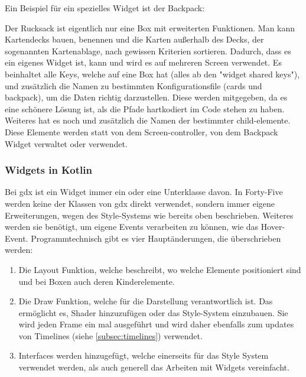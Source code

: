 Ein Beispiel für ein spezielles Widget ist der Backpack:
Der Rucksack ist eigentlich nur eine Box mit erweiterten Funktionen.
Man kann Kartendecks bauen, benennen und die Karten außerhalb des Decks, der sogenannten Kartenablage, nach gewissen Kriterien sortieren.
Dadurch, dass es ein eigenes Widget ist, kann und wird es auf mehreren Screen verwendet.
Es beinhaltet alle Keys, welche auf eine Box hat (alles ab den "widget shared keys"), und zusätzlich die Namen zu bestimmten Konfigurationsfile (cards und backpack), um die Daten richtig darzustellen.
Diese werden mitgegeben, da es eine schönere Lösung ist, als die Pfade hartkodiert im Code stehen zu haben.
Weiteres hat es noch und zusätzlich die Namen der bestimmter child-elemente.
Diese Elemente werden statt von dem Screen-controller, von dem Backpack Widget verwaltet oder verwendet.
\renewcommand{\kapitelautor}{Autor: Felix Zwickelstorfer}
\subsubsection{Widgets in Kotlin}\label{subsubsec:widgetsinkotlin}
\renewcommand{\kapitelautor}{Autor: Felix Zwickelstorfer}
Bei gdx ist ein Widget immer ein  oder eine Unterklasse davon.
In Forty-Five werden keine der Klassen von gdx direkt verwendet, sondern immer eigene Erweiterungen, wegen des Style-Systems wie bereits oben beschrieben.
Weiteres werden sie benötigt, um eigene Events verarbeiten zu können, wie das Hover-Event.
Programmtechnisch gibt es vier Hauptänderungen, die überschrieben werden:
\begin{enumerate}
    \item Die Layout Funktion, welche beschreibt, wo welche Elemente positioniert sind und bei Boxen auch deren Kinderelemente.
    \item Die Draw Funktion, welche für die Darstellung verantwortlich ist. Das ermöglicht es, Shader hinzuzufügen oder das Style-System einzubauen.
        Sie wird jeden Frame ein mal ausgeführt und wird daher ebenfalls zum updates von Timelines (siehe \ref{subsec:timelines}) verwendet.
    \item Interfaces werden hinzugefügt, welche einerseits für das Style System verwendet werden, als auch generell das Arbeiten mit Widgets vereinfacht.
\end{enumerate}
\renewcommand{\kapitelautor}{Autor: Felix Zwickelstorfer}
